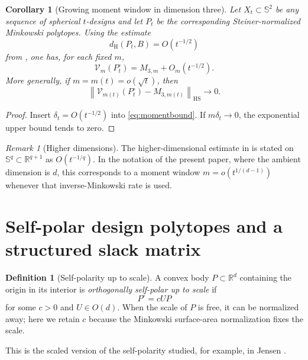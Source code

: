 \documentclass[11pt]{amsart}
\newtheorem{corollary}[theorem]{Corollary}
\theoremstyle{definition}
\newtheorem{definition}[theorem]{Definition}
\theoremstyle{remark}
\newtheorem{remark}[theorem]{Remark}
\newcommand{\R}{\mathbb R}
\newcommand{\Sph}{\mathbb S}
\newcommand{\norm}[1]{\left\lVert #1\right\rVert}
\newcommand{\dH}{d_{\mathrm H}}
\newcommand{\HS}{\mathrm{HS}}
\begin{document}
\begin{corollary}[Growing moment window in dimension three]\label{cor:window}
Let $X_t\subset\Sph^2$ be any sequence of spherical $t$-designs and let $P_t$ be the corresponding Steiner-normalized Minkowski polytopes.  Using the estimate
\[
 \dH(P_t,B)=O(t^{-1/2})
\]
from \cite{An2026}, one has, for each fixed $m$,
\[
 \mathcal V_m(P_t^\circ)=M_{3,m}+O_m(t^{-1/2}).
\]
More generally, if $m=m(t)=o(\sqrt t)$, then
\[
 \norm{\mathcal V_{m(t)}(P_t^\circ)-M_{3,m(t)}}_{\HS}\longrightarrow0.
\]
\end{corollary}

\begin{proof}
Insert $\delta_t=O(t^{-1/2})$ into \eqref{eq:momentbound}.  If $m\delta_t\to0$, the exponential upper bound tends to zero.  \qedhere
\end{proof}

\begin{remark}[Higher dimensions]
The higher-dimensional estimate in \cite{An2026} is stated on $\Sph^q\subset\R^{q+1}$ as $O(t^{-1/q})$.  In the notation of the present paper, where the ambient dimension is $d$, this corresponds to a moment window $m=o(t^{1/(d-1)})$ whenever that inverse-Minkowski rate is used.
\end{remark}

\section{Self-polar design polytopes and a structured slack matrix}
\label{sec:selfpolar}

\begin{definition}[Self-polarity up to scale]\label{def:selfpolar}
A convex body $P\subset\R^d$ containing the origin in its interior is \emph{orthogonally self-polar up to scale} if
\begin{equation}\label{eq:selfpolar}
 P^\circ=cUP
\end{equation}
for some $c>0$ and $U\in O(d)$.  When the scale of $P$ is free, it can be normalized away; here we retain $c$ because the Minkowski surface-area normalization fixes the scale.
\end{definition}

This is the scaled version of the self-polarity studied, for example, in Jensen \cite{Jensen2021}.
\end{document}
